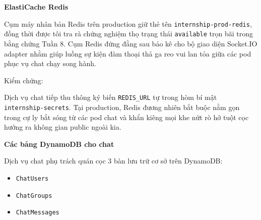 \begin{Shaded}
\begin{Highlighting}[]
\FunctionTok{\{}\FunctionTok{:}\FunctionTok{,}\FunctionTok{:}\FunctionTok{,}\FunctionTok{:\{}\FunctionTok{:}\FunctionTok{\}\}}
\end{Highlighting}
\end{Shaded}

\vspace{0.5em}\noindent\textbf{ElastiCache Redis}\par

Cụm máy nhân bản Redis trên production giữ thẻ tên
\texttt{internship-\allowbreak{}prod-\allowbreak{}redis}, đồng thời được tôi tra rà chứng nghiệm
thọ trạng thái \texttt{available} trọn bãi trong bằng chứng Tuần 8. Cụm
Redis đứng đằng sau bảo kê cho bộ giao diện Socket.IO adapter nhằm giúp
luồng sự kiện đàm thoại thả ga reo vui lan tỏa giữa các pod phục vụ chat
chạy song hành.

Kiểm chứng:

\begin{Shaded}
\begin{Highlighting}[]
\DataTypeTok{\textbackslash{}}
  \DataTypeTok{\textbackslash{}}
\end{Highlighting}
\end{Shaded}

Dịch vụ chat tiếp thu thông ký biến \texttt{REDIS\_\allowbreak{}URL} tự trong hòm bí
mật \texttt{internship-\allowbreak{}secrets}. Tại production, Redis đương nhiên bắt
buộc nằm gọn trong cự ly bắt sóng từ các pod chat và khẩn kiêng mọi khe
nứt rò hở tuột cọc hướng ra không gian public ngoài kia.

\vspace{0.5em}\noindent\textbf{Các bảng DynamoDB cho
chat}\par

Dịch vụ chat phụ trách quán cọc 3 bàn lưu trữ cơ sở trên DynamoDB:

\begin{itemize}
\tightlist
\item
  \texttt{ChatUsers}
\item
  \texttt{ChatGroups}
\item
  \texttt{ChatMessages}
\end{itemize}

